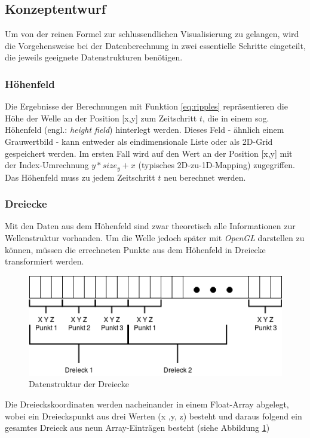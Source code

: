 \documentclass[conference]{IEEEtran}
\begin{document}
\subsection{Konzeptentwurf}
Um von der reinen Formel zur schlussendlichen Visualisierung zu gelangen, wird die Vorgehensweise bei der Datenberechnung in zwei essentielle Schritte eingeteilt, die jeweils geeignete Datenstrukturen ben\"otigen. \\

\subsubsection{H\"ohenfeld}
Die Ergebnisse der Berechnungen mit Funktion \ref{eq:ripples} repr\"asentieren die H\"ohe der Welle an der Position [x,y] zum Zeitschritt $t$, die in einem sog. H\"ohenfeld (engl.: \textit{height field}) hinterlegt werden. Dieses Feld - \"ahnlich einem Grauwertbild - kann entweder als eindimensionale Liste oder als 2D-Grid gespeichert werden. Im ersten Fall wird auf den Wert an der Position [x,y] mit der Index-Umrechnung $y*size_y + x$ (typisches 2D-zu-1D-Mapping) zugegriffen. Das H\"ohenfeld muss zu jedem Zeitschritt $t$ neu berechnet werden.
\\

\subsubsection{Dreiecke}\label{sec:triangles}
Mit den Daten aus dem H\"ohenfeld sind zwar theoretisch alle Informationen zur Wellenstruktur vorhanden. Um die Welle jedoch sp\"ater mit \textit{OpenGL} darstellen zu k\"onnen, m\"ussen die errechneten Punkte aus dem H\"ohenfeld in Dreiecke transformiert werden. 

\begin{figure}[H]
\centerline{\includegraphics[scale=0.55]{img/triangle.png}}
\label{fig:triangle}
\caption{Datenstruktur der Dreiecke}
\end{figure}

Die Dreieckskoordinaten werden nacheinander in einem Float-Array abgelegt, wobei ein Dreieckspunkt aus drei Werten (x ,y, z) besteht und daraus folgend ein gesamtes Dreieck aus neun Array-Eintr\"agen besteht (siehe Abbildung \ref{fig:triangle})
\end{document}

